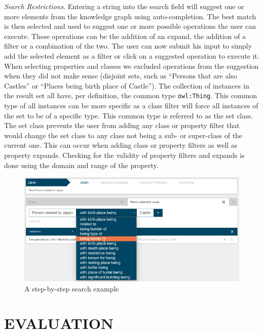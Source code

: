 \documentclass{sig-alternate}
\makeatletter
\def\maxwidth#1{\ifdim\Gin@nat@width>#1 #1\else\Gin@nat@width\fi}
\makeatother
\begin{document}
{\em Search Restrictions}. Entering a string into the search ﬁeld will suggest one or more elements from the knowledge graph using auto-completion. The best match is then selected and used to suggest one or more possible operations the user can execute. These operations can be the addition of an expand, the addition of a ﬁlter or a combination of the two. The user can now submit his input to simply add the selected element as a ﬁlter or click on a suggested operation to execute it. When selecting properties and classes we excluded operations from the suggestion when they did not make sense (disjoint sets, such as ``Persons that are also Castles'' or ``Places being birth place of Castle''). The collection of instances in the result set all have, per deﬁnition, the common type \Verb+owl:Thing+. This common type of all instances can be more speciﬁc as a class ﬁlter will force all instances of the set to be of a speciﬁc type. This common type is referred to as the set class. The set class prevents the user from adding any class or property ﬁlter that would change the set class to any class not being a sub- or super-class of the current one. This can occur when adding class or property ﬁlters as well as property expands. Checking for the validity of property ﬁlters and expands is done using the domain and range of the property.
\begin{figure}[h!]
\centering
\includegraphics[width=\maxwidth{\columnwidth}]{./img/image2.png}
\cprotect\caption{  A step-by-step search example}
\label{_Ref490606403}
\end{figure}


\section{EVALUATION}
\end{document}
